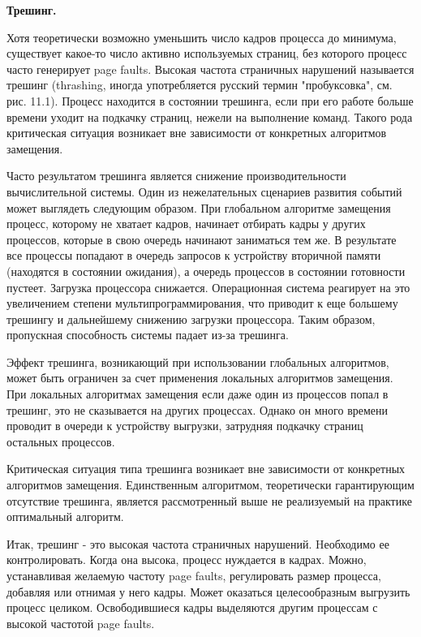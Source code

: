 \begin{center}{\bfseries Трешинг.}
\end{center}

Хотя теоретически возможно уменьшить число кадров процесса до минимума, существует какое-то число активно используемых страниц, без которого процесс часто генерирует page faults. Высокая частота страничных нарушений называется трешинг (thrashing, иногда употребляется русский термин "пробуксовка", см. рис. 11.1). Процесс находится в состоянии трешинга, если при его работе больше времени уходит на подкачку страниц, нежели на выполнение команд. Такого рода критическая ситуация возникает вне зависимости от конкретных алгоритмов замещения.

Часто результатом трешинга является снижение производительности вычислительной системы. Один из нежелательных сценариев развития событий может выглядеть следующим образом. При глобальном алгоритме замещения процесс, которому не хватает кадров, начинает отбирать кадры у других процессов, которые в свою очередь начинают заниматься тем же. В результате все процессы попадают в очередь запросов к устройству вторичной памяти (находятся в состоянии ожидания), а очередь процессов в состоянии готовности пустеет. Загрузка процессора снижается. Операционная система реагирует на это увеличением степени мультипрограммирования, что приводит к еще большему трешингу и дальнейшему снижению загрузки процессора. Таким образом, пропускная способность системы падает из-за трешинга.

Эффект трешинга, возникающий при использовании глобальных алгоритмов, может быть ограничен за счет применения локальных алгоритмов замещения. При локальных алгоритмах замещения если даже один из процессов попал в трешинг, это не сказывается на других процессах. Однако он много времени проводит в очереди к устройству выгрузки, затрудняя подкачку страниц остальных процессов.

Критическая ситуация типа трешинга возникает вне зависимости от конкретных алгоритмов замещения. Единственным алгоритмом, теоретически гарантирующим отсутствие трешинга, является рассмотренный выше не реализуемый на практике оптимальный алгоритм.

Итак, трешинг - это высокая частота страничных нарушений. Hеобходимо ее контролировать. Когда она высока, процесс нуждается в кадрах. Можно, устанавливая желаемую частоту page faults, регулировать размер процесса, добавляя или отнимая у него кадры. Может оказаться целесообразным выгрузить процесс целиком. Освободившиеся кадры выделяются другим процессам с высокой частотой page faults.

